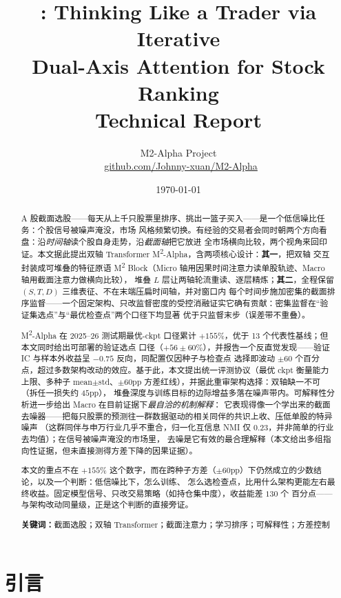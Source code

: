 \documentclass[a4paper,11pt,fontset=fandol]{ctexart}
\title{\bfseries \msqa: Thinking Like a Trader via Iterative\\
       Dual-Axis Attention for Stock Ranking\\[4pt]\large Technical Report}
\author{M2-Alpha Project\\[3pt]
{\normalsize\faGithub~\href{https://github.com/Johnny-xuan/M2-Alpha}{github.com/Johnny-xuan/M2-Alpha}}}
\date{\today}
\newcommand{\msq}{\texorpdfstring{M\textsuperscript{2}}{M2}}  %
\newcommand{\msqa}{\texorpdfstring{M\textsuperscript{2}-Alpha}{M2-Alpha}} %
\begin{document}
\maketitle

\begin{abstract}
\noindent
A 股截面选股——每天从上千只股票里排序、挑出一篮子买入——是一个低信噪比任务：个股信号被噪声淹没，市场
风格频繁切换。有经验的交易者会同时朝两个方向看盘：沿\emph{时间轴}读个股自身走势，沿\emph{截面轴}把它放进
全市场横向比较，两个视角来回印证。本文据此提出双轴 Transformer \msqa{}，含两项核心设计：\textbf{其一}，把双轴
交互封装成可堆叠的特征原语 \msq{} Block（Micro 轴用因果时间注意力读单股轨迹、Macro 轴用截面注意力做横向比较），
堆叠 $L$ 层让两轴轮流重读、逐层精炼；\textbf{其二}，全程保留 $(S,T,D)$ 三维表征、不在末端压扁时间轴，并对窗口内
每个时间步施加密集的截面排序监督——一个固定架构、只改监督密度的受控消融证实它确有贡献：密集监督在“验证集选点”与“最优检查点”两个口径下均显著
优于只监督末步（误差带不重叠）。

\msqa{} 在 2025--26 测试期最优-ckpt 口径累计 $+155\%$，优于 13 个代表性基线；但本文同时给出可部署的验证选点
口径（$+56\pm60\%$），并报告一个反直觉发现——验证 IC 与样本外收益呈 $-0.75$ 反向，同配置仅因种子与检查点
选择即波动 $\pm 60$ 个百分点，超过多数架构改动的效应。基于此，本文提出统一评测协议（最优 ckpt 衡量能力
上限、多种子 mean$\pm$std、$\pm 60$pp 方差红线），并据此重审架构选择：双轴缺一不可（拆任一损失约 $45$pp），
堆叠深度与训练目标的边际增益多落在噪声带内。可解释性分析进一步给出 Macro 在目前证据下\emph{最自洽的机制解释}：
它表现得像一个学出来的截面去噪器——把每只股票的预测往一群数据驱动的相关同伴的共识上收、压低单股的特异噪声
（这群同伴与申万行业几乎不重合，归一化互信息 NMI 仅 $0.23$，并非简单的行业去均值）；在信号被噪声淹没的市场里，
去噪是它有效的最合理解释（本文给出多组指向性证据，但未直接测得方差下降的因果证据）。

本文的重点不在 $+155\%$ 这个数字，而在跨种子方差（$\pm 60$pp）下仍然成立的少数结论，以及一个判断：低信噪比下，怎么训练、
怎么选检查点，比用什么架构更能左右最终收益。固定模型信号、只改交易策略（如持仓集中度），收益能差 $130$ 个
百分点——与架构改动同量级，正是这个判断的直接旁证。

\medskip
\noindent\textbf{关键词：}截面选股；双轴 Transformer；截面注意力；学习排序；可解释性；方差控制
\end{abstract}

\section{引言}\label{sec:intro}
\end{document}
